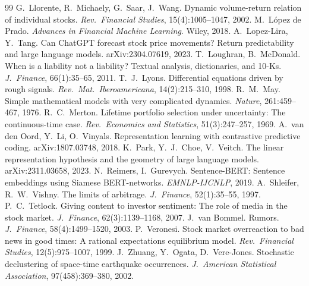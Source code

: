 \documentclass[10pt,twocolumn,letterpaper]{article}
\theoremstyle{plain}
\theoremstyle{definition}
\theoremstyle{remark}
\begin{document}
{\begin{thebibliography}{99}
 G.~Llorente, R.~Michaely, G.~Saar, J.~Wang. Dynamic volume-return relation of individual stocks. \emph{Rev.\ Financial Studies}, 15(4):1005--1047, 2002.
 M.~L\'opez de Prado. \emph{Advances in Financial Machine Learning}. Wiley, 2018.
 A.~Lopez-Lira, Y.~Tang. Can ChatGPT forecast stock price movements? Return predictability and large language models. arXiv:2304.07619, 2023.
 T.~Loughran, B.~McDonald. When is a liability not a liability? Textual analysis, dictionaries, and 10-Ks. \emph{J.\ Finance}, 66(1):35--65, 2011.
 T.~J.~Lyons. Differential equations driven by rough signals. \emph{Rev.\ Mat.\ Iberoamericana}, 14(2):215--310, 1998.
 R.~M.~May. Simple mathematical models with very complicated dynamics. \emph{Nature}, 261:459--467, 1976.
 R.~C.~Merton. Lifetime portfolio selection under uncertainty: The continuous-time case. \emph{Rev.\ Economics and Statistics}, 51(3):247--257, 1969.
 A.~van den Oord, Y.~Li, O.~Vinyals. Representation learning with contrastive predictive coding. arXiv:1807.03748, 2018.
 K.~Park, Y.~J.~Choe, V.~Veitch. The linear representation hypothesis and the geometry of large language models. arXiv:2311.03658, 2023.
 N.~Reimers, I.~Gurevych. Sentence-BERT: Sentence embeddings using Siamese BERT-networks. \emph{EMNLP-IJCNLP}, 2019.
 A.~Shleifer, R.~W.~Vishny. The limits of arbitrage. \emph{J.\ Finance}, 52(1):35--55, 1997.
 P.~C.~Tetlock. Giving content to investor sentiment: The role of media in the stock market. \emph{J.\ Finance}, 62(3):1139--1168, 2007.
 J.~van Bommel. Rumors. \emph{J.\ Finance}, 58(4):1499--1520, 2003.
 P.~Veronesi. Stock market overreaction to bad news in good times: A rational expectations equilibrium model. \emph{Rev.\ Financial Studies}, 12(5):975--1007, 1999.
 J.~Zhuang, Y.~Ogata, D.~Vere-Jones. Stochastic declustering of space-time earthquake occurrences. \emph{J.\ American Statistical Association}, 97(458):369--380, 2002.
\end{thebibliography}
}
\end{document}
